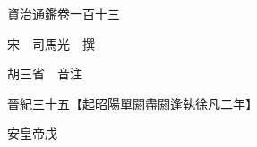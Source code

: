 










 


 
 


 

  
  
  
  
  





  
  
  
  
  
 
  

  

  
  
  



  

 
 

  
   




  

  
  


  　　資治通鑑卷一百十三

　　宋　司馬光　撰

　　胡三省　音注

　　晉紀三十五【起昭陽單閼盡閼逢執徐凡二年】

　　安皇帝戊

